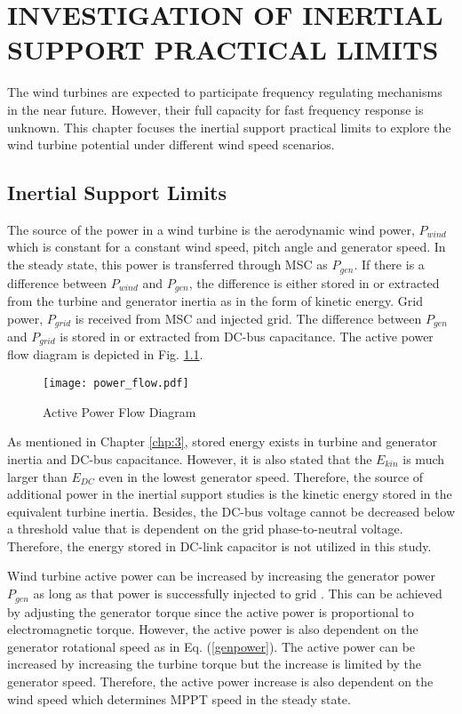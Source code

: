 \chapter{INVESTIGATION OF INERTIAL SUPPORT PRACTICAL LIMITS}
\label{chp:4}
The wind turbines are expected to participate frequency regulating mechanisms in the near future. However, their full capacity for fast frequency response is unknown. This chapter focuses the inertial support practical limits to explore the wind turbine potential under different wind speed scenarios.
\section{Inertial Support Limits}
\label{sec:klimit}
The source of the power in a wind turbine is the aerodynamic wind power, $P_{wind}$ which is constant for a constant wind speed, pitch angle and generator speed. In the steady state, this power is transferred through MSC as $P_{gen}$. If there is a difference between $P_{wind}$ and $P_{gen}$, the difference is either stored in or extracted from the turbine and generator inertia as in the form of kinetic energy. Grid power, $P_{grid}$ is received from MSC and injected grid. The difference between $P_{gen}$ and $P_{grid}$ is stored in or extracted from DC-bus capacitance. The active power flow diagram is depicted in Fig. \ref{power_flow}. \par
\begin{figure}[h]
	\centering
	\texttt{[image: power\_flow.pdf]}
	\caption{Active Power Flow Diagram}
	\label{power_flow}
\end{figure}
As mentioned in Chapter \ref{chp:3}, stored energy exists in turbine and generator inertia and DC-bus capacitance. However, it is also stated that the $E_{kin}$ is much larger than $E_{DC}$ even in the lowest generator speed. Therefore, the source of additional power in the inertial support studies is the kinetic energy stored in the equivalent turbine inertia. Besides, the DC-bus voltage cannot be decreased below a threshold value that is dependent on the grid phase-to-neutral voltage. Therefore, the energy stored in DC-link capacitor is not utilized in this study.\par
Wind turbine active power can be increased by increasing the generator power $P_{gen}$ as long as that power is successfully injected to grid . This can be achieved by adjusting the generator torque since the active power is proportional to electromagnetic torque. However, the active power is also dependent on the generator rotational speed as in Eq. (\ref{genpower}). The active power can be increased by increasing the turbine torque but the increase is limited by the generator speed. Therefore, the active power increase is also dependent on the wind speed which determines MPPT speed in the steady state.
